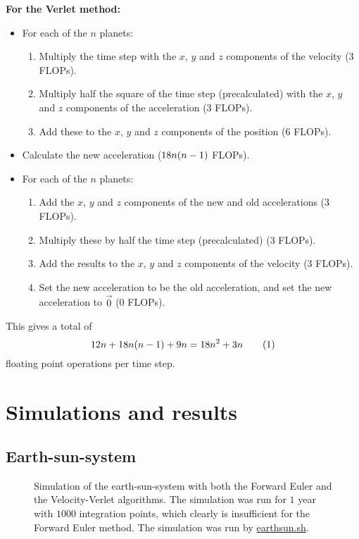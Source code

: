 \documentclass[12pt,english,a4paper]{article}
\newcommand{\eqtag}[1]{\refstepcounter{equation}\tag{\theequation}\label{#1}}
\newcommand{\program}[1]{\href{https://github.com/anjohan/Offentlig/blob/master/FYS3150/Oblig3/#1}{#1}}
\begin{document}
\textbf{For the Verlet method:}
\begin{itemize}
\item For each of the \(n\) planets:
\begin{enumerate}
\item Multiply the time step with the \(x\), \(y\) and \(z\) components of the velocity (3 FLOPs).
\item Multiply half the square of the time step (precalculated) with the \(x\), \(y\) and \(z\) components of the acceleration (3 FLOPs).
\item Add these to the \(x\), \(y\) and \(z\) components of the position (6 FLOPs).
\end{enumerate}
\item Calculate the new acceleration (\(18n\qty(n-1)\) FLOPs).
\item For each of the \(n\) planets:
\begin{enumerate}
\item Add the \(x\), \(y\) and \(z\) components of the new and old accelerations (3 FLOPs).
\item Multiply these by half the time step (precalculated) (3 FLOPs).
\item Add the results to the \(x\), \(y\) and \(z\) components of the velocity (3 FLOPs).
\item Set the new acceleration to be the old acceleration, and set the new acceleration to \(\vec{0}\) (0 FLOPs).
\end{enumerate}
\end{itemize}
This gives a total of \[12n + 18n\qty(n-1) + 9n = 18n^2+3n\eqtag{verletflops}\] floating point operations per time step.

%
\section{Simulations and results}
\subsection{Earth-sun-system}
\begin{figure}[H]
\centering

\caption{Simulation of the earth-sun-system with both the Forward Euler and the Velocity-Verlet algorithms. The simulation was run for \(1\) year with \(\num{1000}\) integration points, which clearly is insufficient for the Forward Euler method. The simulation was run by \program{earthsun.sh}.}
\end{figure}
\end{document}
